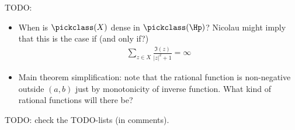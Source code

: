TODO:

\begin{itemize}
	\item When is $\pickclass(X)$ dense in $\pickclass(\Hp)$? Nicolau might imply that this is the case if (and only if?)
	\begin{align*}
		\sum_{z \in X} \frac{\Im(z)}{|z|^2 + 1} = \infty
	\end{align*}
	\item Main theorem simplification: note that the rational function is non-negative outside $(a, b)$ just by monotonicity of inverse function. What kind of rational functions will there be?
\end{itemize}

TODO: check the TODO-lists (in comments).

























